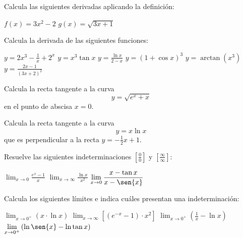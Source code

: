 \begin{ejemplo}
{
    Calcula las siguientes derivadas aplicando la definición:
    \begin{apartados}
     \ap $f(x)=3x^2-2$
     \ap $g(x)=\sqrt{3x+1}$
    \end{apartados}
}
\end{ejemplo}

\begin{ejemplo}
{
    Calcula la derivada de las siguientes funciones:
    \begin{apartadosc}
     \ap $\displaystyle{y=2x^3-\frac1x+2^x}$
     \ap $\displaystyle{y=x^3\tan{x}}$
     \ap $\displaystyle{y=\frac{\ln{x}}{2-x}}$
     \ap $\displaystyle{y=(1+\cos{x})^3}$
     \ap $\displaystyle{y=\arctan{(x^3)}}$
     \ap $\displaystyle{y=\frac{2x-1}{(3x+2)^2}}$
    \end{apartadosc}
}
\end{ejemplo}

\begin{ejemplo}{
    Calcula la recta tangente a la curva \[y=\sqrt{e^x+x}\] en el punto de abscisa $x=0$.
}
\end{ejemplo}

\begin{ejemplo}{
    Calcula la recta tangente a la curva \[y=x\ln{x}\] que es perpendicular a la recta $y=-\frac12x+1$.
}
\end{ejemplo}


\begin{ejemplo}{
    Resuelve las siguientes indeterminaciones $\left[\frac00\right]$ y $\left[\frac{\infty}{\infty}\right]$:
    \begin{apartadosc}
        \ap $\displaystyle{
                \lim_{x\to0}\frac{e^x-1}{x}
            }$
        \ap $\displaystyle{
                \lim_{x\to\infty}\frac{\ln{x}}{x^2}
            }$
        \ap $\displaystyle{
                \lim_{x\to0}\frac{x-\tan{x}}{x-\sen{x}}
            }$
    \end{apartadosc}
}
\end{ejemplo}

\begin{ejemplo}{
    Calcula los siguientes límites e indica cuáles presentan una indeterminación:
    \begin{apartadosc}
        \ap $\displaystyle{
                \lim_{x\to0^+}\left(x\cdot\ln{x}\right)
            }$
        \ap $\displaystyle{
                \lim_{x\to\infty}\left[(e^{-x}-1)\cdot x^2\right]
            }$
        \ap $\displaystyle{
                \lim_{x\to0^+}\left(\frac1x-\ln{x}\right)
            }$
        \ap $\displaystyle{
                \lim_{x\to0^+}\left(\ln\sen{x}-\ln\tan{x}\right)
            }$
    \end{apartadosc}
}
\end{ejemplo}

